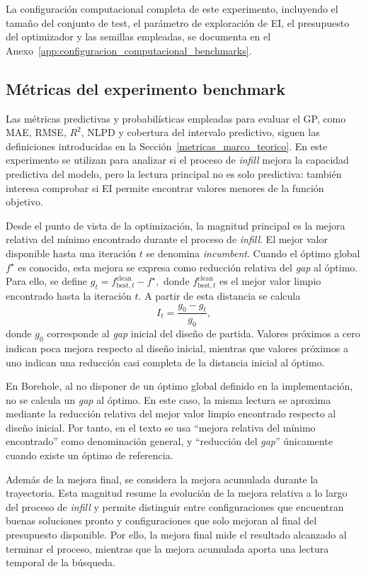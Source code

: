 La configuración computacional completa de este experimento, incluyendo el tamaño del conjunto de test, el parámetro
  de exploración de EI, el presupuesto del optimizador y las semillas empleadas, se documenta en el
  Anexo~\ref{app:configuracion_computacional_benchmarks}.
  
\subsection{Métricas del experimento benchmark}
\label{subsubsec:metricas_benchmarks}

Las métricas predictivas y probabilísticas empleadas para evaluar el GP, como MAE, RMSE, \(R^2\), NLPD y cobertura del intervalo predictivo, siguen las definiciones introducidas en la Sección~\ref{metricas_marco_teorico}. En este experimento se utilizan para analizar si el proceso de \emph{infill} mejora la capacidad predictiva del modelo, pero la lectura principal no es solo predictiva: también interesa comprobar si EI permite encontrar valores menores de la función objetivo.

Desde el punto de vista de la optimización, la magnitud principal es la mejora relativa del mínimo encontrado durante el proceso de \emph{infill}. El mejor valor disponible hasta una iteración \(t\) se denomina \emph{incumbent}. Cuando el óptimo global \(f^\star\) es conocido, esta mejora se expresa como reducción relativa del \emph{gap} al óptimo. Para ello, se define
\(
    g_t = f_{\mathrm{best},t}^{\mathrm{clean}} - f^\star,
\)
donde \(f_{\mathrm{best},t}^{\mathrm{clean}}\) es el mejor valor limpio encontrado hasta la iteración \(t\). A partir de esta distancia se calcula
\[
    I_t = \frac{g_0 - g_t}{g_0},
\]
donde \(g_0\) corresponde al \emph{gap} inicial del diseño de partida. Valores próximos a cero indican poca mejora respecto al diseño inicial, mientras que valores próximos a uno indican una reducción casi completa de la distancia inicial al óptimo.

En Borehole, al no disponer de un óptimo global definido en la implementación, no se calcula un \emph{gap} al óptimo. En este caso, la misma lectura se aproxima mediante la reducción relativa del mejor valor limpio encontrado respecto al diseño inicial. Por tanto, en el texto se usa ``mejora relativa del mínimo encontrado'' como denominación general, y ``reducción del \emph{gap}'' únicamente cuando existe un óptimo de referencia.

Además de la mejora final, se considera la mejora acumulada durante la trayectoria. Esta magnitud resume la evolución de la mejora relativa a lo largo del proceso de \emph{infill} y permite distinguir entre configuraciones que encuentran buenas soluciones pronto y configuraciones que solo mejoran al final del presupuesto disponible. Por ello, la mejora final mide el resultado alcanzado al terminar el proceso, mientras que la mejora acumulada aporta una lectura temporal de la búsqueda.

